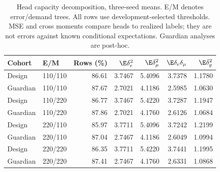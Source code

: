 \begin{table}[htbp]
\centering\small
\caption{Head capacity decomposition, three-seed means. E/M denotes error/demand trees. All rows use development-selected thresholds. MSE and cross moments compare heads to realized labels; they are not errors against known conditional expectations. Guardian analyses are post-hoc.}
\label{tab:headfactor}
\begin{tabular}{llrrrrr}\toprule
Cohort & E/M & Rows (\%) & $\E\delta_e^2$ & $\E\delta_\mu^2$ & $\E\delta_e\delta_\mu$ & $\E\delta_g^2$\\\midrule
Design & 110/110 & 86.61 & 3.7467 & 5.4096 & 3.7378 & 1.1780 \\
Guardian & 110/110 & 87.67 & 2.7021 & 4.1186 & 2.5985 & 1.0630 \\
Design & 110/220 & 86.77 & 3.7467 & 5.4220 & 3.7287 & 1.1947 \\
Guardian & 110/220 & 87.86 & 2.7021 & 4.1760 & 2.6126 & 1.0684 \\
Design & 220/110 & 85.97 & 3.7711 & 5.4096 & 3.7242 & 1.2199 \\
Guardian & 220/110 & 87.04 & 2.7467 & 4.1186 & 2.6049 & 1.0994 \\
Design & 220/220 & 86.35 & 3.7711 & 5.4220 & 3.7441 & 1.1995 \\
Guardian & 220/220 & 87.41 & 2.7467 & 4.1760 & 2.6331 & 1.0868 \\
\bottomrule\end{tabular}
\end{table}
